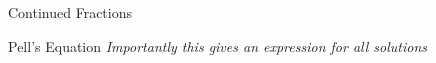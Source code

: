 \documentclass[12pt, letterpaper]{article}
\begin{document}
\begin{section}{Continued Fractions}
\begin{subsection}{Pell's Equation}
    \emph{Importantly this gives an expression for all solutions}

  \end{subsection}

\end{section}
\end{document}
